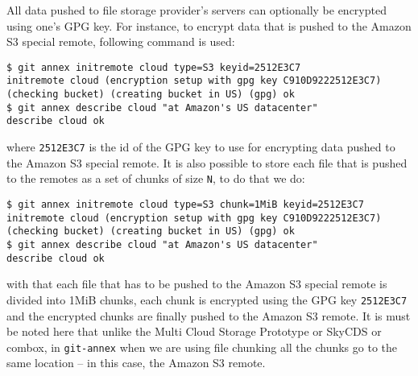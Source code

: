 All data pushed to file storage provider's servers can optionally be
encrypted using one's GPG key. For instance, to encrypt data that is
pushed to the Amazon S3 special remote, following command is
used\cite{docs:git-annex-as3}:

\begin{verbatim}
$ git annex initremote cloud type=S3 keyid=2512E3C7
initremote cloud (encryption setup with gpg key C910D9222512E3C7) (checking bucket) (creating bucket in US) (gpg) ok
$ git annex describe cloud "at Amazon's US datacenter"
describe cloud ok
\end{verbatim}

where \verb+2512E3C7+ is the id of the GPG key to use for encrypting
data pushed to the Amazon S3 special remote. It is also possible to
store each file that is pushed to the remotes as a set of chunks of
size \verb+N+, to do that we do:

\begin{verbatim}
$ git annex initremote cloud type=S3 chunk=1MiB keyid=2512E3C7
initremote cloud (encryption setup with gpg key C910D9222512E3C7) (checking bucket) (creating bucket in US) (gpg) ok
$ git annex describe cloud "at Amazon's US datacenter"
describe cloud ok
\end{verbatim}

with that each file that has to be pushed to the Amazon S3 special
remote is divided into 1MiB chunks, each chunk is encrypted using the
GPG key \verb+2512E3C7+ and the encrypted chunks are finally pushed to
the Amazon S3 remote. It is must be noted here that unlike the Multi
Cloud Storage Prototype or SkyCDS or combox, in \verb+git-annex+ when
we are using file chunking all the chunks go to the same location --
in this case, the Amazon S3 remote.
